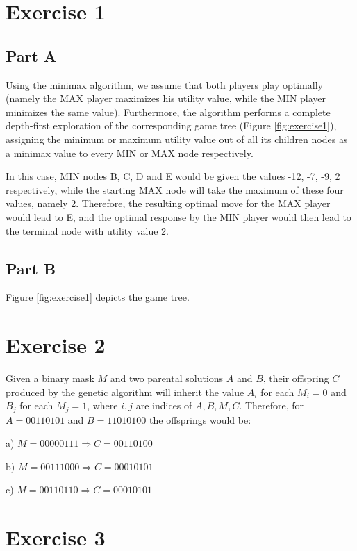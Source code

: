 \section*{Exercise 1}
\label{sec:exercise1}

\subsection*{Part A}

Using the minimax algorithm, we assume that both players play optimally (namely the MAX player maximizes his utility value, while the MIN player minimizes the same value). Furthermore, the algorithm performs a complete depth-first exploration of the corresponding game tree (Figure \ref{fig:exercise1}), assigning the minimum or maximum utility value out of all its children nodes as a minimax value to every MIN or MAX node respectively. 

In this case, MIN nodes B, C, D and E would be given the values -12, -7, -9, 2 respectively, while the starting MAX node will take the maximum of these four values, namely 2. Therefore, the resulting optimal move for the MAX player would lead to E, and the optimal response by the MIN player would then lead to the terminal node with utility value 2.

\subsection*{Part B}

Figure \ref{fig:exercise1} depicts the game tree.



\section*{Exercise 2}

Given a binary mask $M$ and two parental solutions $A$ and $B$, their offspring $C$ produced by the genetic algorithm will inherit the value $A_i$ for each $M_i = 0$ and $B_j$ for each $M_j = 1$, where $i,j$ are indices of $A, B, M, C$. Therefore, for $A=00110101$ and $B=11010100$ the offsprings would be:

a) $ M=00000111 \Rightarrow C =  00110100$

b) $ M=00111000 \Rightarrow C = 00010101$

c) $ M=00110110 \Rightarrow C = 00010101$

\section*{Exercise 3}

